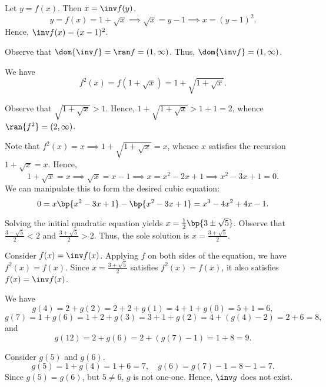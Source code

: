 \begin{solution}
    \begin{ppart}
        \begin{psubpart}
            Let $y = f(x)$. Then $x = \inv f(y)$. \[y = f(x) = 1 + \sqrt{x} \implies \sqrt{x} = y -1 \implies x = (y-1)^2.\] Hence, $\inv f(x) = (x-1)^2$.

            Observe that $\dom{\inv f} = \ran f = (1, \infty)$. Thus, $\dom{\inv f} = (1, \infty)$.
        \end{psubpart}
        \begin{psubpart}
            We have \[f^2(x) = f(1+\sqrt{x}) = 1 + \sqrt{1 + \sqrt{x}}.\]

            Observe that $\sqrt{1 + \sqrt{x}} > 1$. Hence, $1 + \sqrt{1 + \sqrt{x}} > 1 + 1 = 2$, whence $\ran{f^2} = (2, \infty)$.
        \end{psubpart}
        \begin{psubpart}
            Note that $f^2(x) = x \implies 1 + \sqrt{1 + \sqrt{x}} = x$, whence $x$ satisfies the recursion $1 + \sqrt{x} = x$. Hence, \[1 + \sqrt{x} = x \implies \sqrt{x} = x - 1 \implies x = x^2 - 2x + 1 \implies x^2 - 3x + 1 = 0.\] We can manipulate this to form the desired cubic equation: \[0 = x\bp{x^2 - 3x + 1} - \bp{x^2 -3x + 1} = x^3 - 4x^2 + 4x - 1.\]

            Solving the initial quadratic equation yields $x = \frac12 \bp{3 \pm \sqrt5}$. Observe that $\frac{3 - \sqrt{5}}{2} < 2$ and $\frac{3 + \sqrt{5}}{2} > 2$. Thus, the sole solution is $x = \frac{3 + \sqrt{5}}{2}$.

            Consider $f(x) = \inv f(x)$. Applying $f$ on both sides of the equation, we have $f^2(x) = f(x)$. Since $x = \frac{3 + \sqrt{5}}{2}$ satisfies $f^2(x) = f(x)$, it also satisfies $f(x) = \inv f(x)$.
        \end{psubpart}
    \end{ppart}
    \clearpage
    \begin{ppart}
        \begin{psubpart}
            We have \[g(4) = 2 + g(2) = 2 + 2 + g(1) = 4 + 1 + g(0) = 5 + 1 = 6,\] \[g(7) = 1 + g(6) = 1 + 2 + g(3) = 3 + 1 + g(2) = 4 + (g(4)-2) = 2 + 6 = 8,\] and \[g(12) = 2 + g(6) = 2 + (g(7) - 1) = 1 + 8 = 9.\]
        \end{psubpart}
        \begin{psubpart}
            Consider $g(5)$ and $g(6)$. \[g(5) = 1 + g(4) = 1 + 6 = 7, \quad g(6) = g(7) - 1 = 8 - 1 = 7.\] Since $g(5) = g(6)$, but $5 \neq 6$, $g$ is not one-one. Hence, $\inv g$ does not exist.
        \end{psubpart}
    \end{ppart}
\end{solution}
